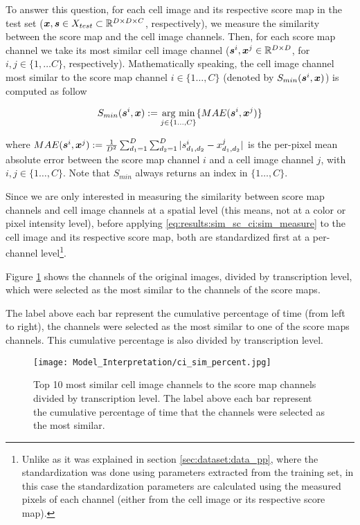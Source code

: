 To answer this question, for each cell image and its respective score map in the test set ($\boldsymbol{x}, \boldsymbol{s} \in X_{test} \subset \mathbb{R}^{D \times D \times C}$, respectively), we measure the similarity between the score map and the cell image channels. Then, for each score map channel we take its most similar cell image channel ($\boldsymbol{s}^i, \boldsymbol{x}^j \in \mathbb{R}^{D \times D}$, for $i,j \in \{1, \dots C\}$, respectively).
Mathematically speaking, the cell image channel most similar to the score map channel $i \in \{1 \dots, C\}$ (denoted by $S_{min}(\boldsymbol{s}^i, \boldsymbol{x})$) is computed as follow

\begin{equation}
  S_{min}(\boldsymbol{s}^i, \boldsymbol{x}) := \underset{j \in \{1 \dots, C\}}{\text{arg min}} \{MAE(\boldsymbol{s}^i, \boldsymbol{x}^j)\}
  \label{eq:results:sim_sc_ci:sim_measure}
\end{equation}

\noindent where $MAE(\boldsymbol{s}^i, \boldsymbol{x}^j):=\frac{1}{D^2} \sum_{d_1=1}^D \sum_{d_2=1}^D |s^i_{d_1, d_2}-x^j_{d_1, d_2}|$ is the per-pixel mean absolute error between the score map channel $i$ and a cell image channel $j$, with $i, j \in \{1 \dots, C\}$.
Note that $S_{min}$ always returns an index in $\{1 \dots, C\}$.

Since we are only interested in measuring the similarity between score map channels and cell image channels at a spatial level (this means, not at a color or pixel intensity level), before applying \ref{eq:results:sim_sc_ci:sim_measure} to the cell image and its respective score map, both are standardized first at a per-channel level\footnote{Unlike as it was explained in section \ref{sec:dataset:data_pp}, where the standardization was done using parameters extracted from the training set, in this case the standardization parameters are calculated using the measured pixels of each channel (either from the cell image or its respective score map).}.

Figure \ref{fig:results:sm_ci_sim:most} shows the channels of the original images, divided by transcription level, which were selected as the most similar to the channels of the score maps.

The label above each bar represent the cumulative percentage of time (from left to right), the channels were selected as the most similar to one of the score maps channels. This cumulative percentage is also divided by transcription level.

\begin{figure}[htb]
  \centering
  \texttt{[image: Model\_Interpretation/ci\_sim\_percent.jpg]}
  \caption{Top 10 most similar cell image channels to the score map channels divided by transcription level. The label above each bar represent the cumulative percentage of time that the channels were selected as the most similar.}
  \label{fig:results:sm_ci_sim:most}
\end{figure}

